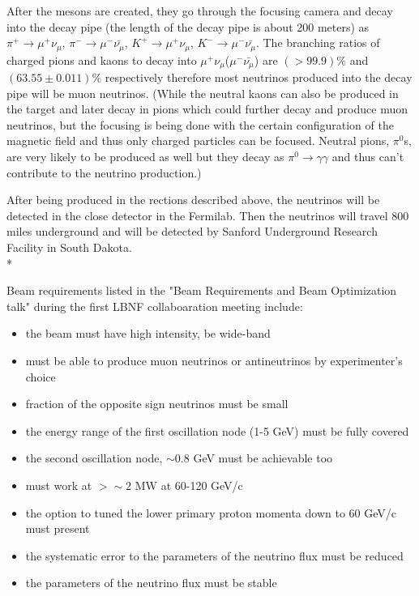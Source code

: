 After the mesons are created, they go through the focusing camera and decay into the decay pipe (the length of the decay pipe is about 200 meters) as $\pi^+ \rightarrow \mu^+\nu_\mu$, $\pi^- \rightarrow \mu^-\bar{\nu_\mu}$, $K^+ \rightarrow \mu^+\nu_\mu$, $K^- \rightarrow \mu^-\bar{\nu_\mu}$. The branching ratios of charged pions and kaons to decay into $\mu^+\nu_\mu$($\mu^-\bar{\nu_\mu}$) are $(>99.9)\%$ and $(63.55\pm0.011)\%$ respectively therefore most neutrinos produced into the decay pipe will be muon neutrinos. (While the neutral kaons can also be produced in the target and later decay in pions which could further decay and produce muon neutrinos, but the focusing is being done with the certain configuration of the magnetic field and thus only charged particles can be focused. Neutral pions, $\pi^0$s, are very likely to be produced as well but they decay as $\pi^0 \rightarrow \gamma\gamma$ and thus can't contribute to the neutrino production.)

After being produced in the rections described above, the neutrinos will be detected in the close detector in the Fermilab. Then the neutrinos will travel 800 miles underground and will be detected by Sanford Underground Research Facility in South Dakota.\\*  

Beam requirements listed in the "Beam Requirements and Beam Optimization talk" during the first LBNF collaboaration meeting include:
\begin{itemize}
  \item the beam must have high intensity, be wide-band
  \item must be able to produce muon neutrinos or antineutrinos by experimenter's choice
  \item fraction of the opposite sign neutrinos must be small
  \item the energy range of the first oscillation node (1-5 GeV) must be fully covered
  \item the second oscillation node, $\sim{0.8}$ GeV must be achievable too
  \item must work at $>\sim{2} $ MW at 60-120 GeV/c
  \item the option to tuned the lower primary proton momenta down to 60 GeV/c must present
  \item the systematic error to the parameters of the neutrino flux must be reduced
  \item the parameters of the neutrino flux must be stable
\end{itemize}

